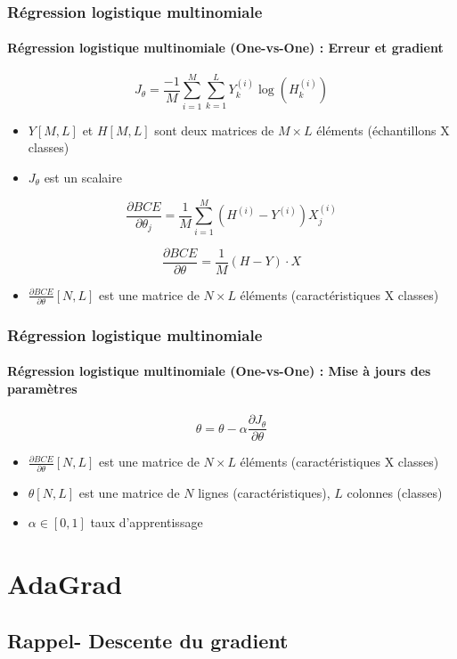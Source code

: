 \documentclass[xcolor=table]{beamer}
\begin{document}
\begin{frame}
	\frametitle{Régression logistique multinomiale}
	\framesubtitle{Régression logistique multinomiale (One-vs-One) : Erreur et gradient}
	
	\[J_\theta = \frac{-1}{M} \sum\limits_{i=1}^{M} \sum_{k=1}^{L} Y^{(i)}_k \log(H^{(i)}_k)\]
	\begin{itemize}
		\item $Y[M, L]$ et $H[M, L]$ sont deux matrices de $M\times L$ éléments (échantillons X classes)
		\item $J_\theta$ est un scalaire
	\end{itemize}
	
	
	\[
	\frac{\partial BCE}{\partial \theta_j} = \frac{1}{M} \sum\limits_{i=1}^{M} (H^{(i)} - Y^{(i)}) X_j^{(i)}
	\]
	
	\[
	\frac{\partial BCE}{\partial \theta} = \frac{1}{M} (H - Y) \cdot X
	\]
	
	\begin{itemize}
		\item $\frac{\partial BCE}{\partial \theta}[N, L]$ est une matrice de $N\times L$ éléments (caractéristiques X classes)
	\end{itemize}
	
\end{frame}

\begin{frame}
	\frametitle{Régression logistique multinomiale}
	\framesubtitle{Régression logistique multinomiale (One-vs-One) : Mise à jours des paramètres}
	
	\[\theta = \theta - \alpha \frac{\partial J_\theta}{\partial \theta}\]
	
	\begin{itemize}
		\item $\frac{\partial BCE}{\partial \theta}[N, L]$ est une matrice de $N\times L$ éléments (caractéristiques X classes)
		\item $\theta[N, L]$ est une matrice de $N$ lignes (caractéristiques), $L$ colonnes (classes)
		\item $\alpha \in [0, 1]$ taux d'apprentissage
	\end{itemize}
	
\end{frame}

\section{AdaGrad}

\subsection{Rappel- Descente du gradient}
\end{document}
